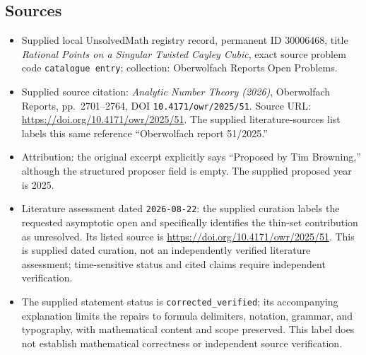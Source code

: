 \documentclass[11pt]{article}
\begin{document}
\subsection{Sources}
\begin{itemize}
\item Supplied local UnsolvedMath registry record, permanent ID \(30006468\), title \emph{Rational Points on a Singular Twisted Cayley Cubic}, exact source problem code \texttt{catalogue entry}; collection: Oberwolfach Reports Open Problems.
\item Supplied source citation: \emph{Analytic Number Theory (2026)}, Oberwolfach Reports, pp.~2701--2764, DOI \texttt{10.4171/owr/2025/51}. Source URL: \url{https://doi.org/10.4171/owr/2025/51}. The supplied literature-sources list labels this same reference ``Oberwolfach report 51/2025.''
\item Attribution: the original excerpt explicitly says ``Proposed by Tim Browning,'' although the structured proposer field is empty. The supplied proposed year is 2025.
\item Literature assessment dated \texttt{2026-08-22}: the supplied curation labels the requested asymptotic open and specifically identifies the thin-set contribution as unresolved. Its listed source is \url{https://doi.org/10.4171/owr/2025/51}. This is supplied dated curation, not an independently verified literature assessment; time-sensitive status and cited claims require independent verification.
\item The supplied statement status is \texttt{corrected\_verified}; its accompanying explanation limits the repairs to formula delimiters, notation, grammar, and typography, with mathematical content and scope preserved. This label does not establish mathematical correctness or independent source verification.
\end{itemize}
\end{document}
